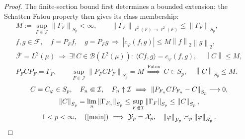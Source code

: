 \documentclass[11pt]{amsart}
\newcommand{\X}{\mathcal X}
\newcommand{\Y}{\mathcal Y}
\newcommand{\ip}[2]{\langle #1,#2\rangle}
\newcommand{\norm}[1]{\left\|#1\right\|}
\newcommand{\fin}{\Subset}
\begin{document}
\begin{proof}
The finite-section bound first determines a bounded extension;
the Schatten Fatou property then gives its class membership:
\begin{gather*}
 M:=\sup_{F\fin\mathcal I}\norm{\Gamma_F}_{S_p}<\infty,\qquad
 \norm{\Gamma_F}_{\ell^2(F)\to\ell^2(F)}\le\norm{\Gamma_F}_{S_p},\\
 f,g\in\mathscr F,\quad f=P_Ff,\quad g=P_Fg
 \ \Longrightarrow\
 |c_\varphi(f,g)|\le M\norm f_2\norm g_2,\\
 \overline{\mathscr F}=L^2(\mu)
 \ \Longrightarrow\
 \exists!\, C\in\mathcal B(L^2(\mu)):\
 \ip{Cf}{g}=c_\varphi(f,g),\quad \norm C\le M,\\
 P_FCP_F=\Gamma_F,\qquad
 \sup_{F\fin\mathcal I}\norm{P_FCP_F}_{S_p}=M
 \ \overset{\mathrm{Fatou}}{\Longrightarrow}\
 C\in S_p,\quad\norm C_{S_p}\le M.
\end{gather*}
\begin{gather*}
 C=C_\varphi\in S_p,\quad F_n\fin\mathcal I,\quad F_n\uparrow\mathcal I
 \ \Longrightarrow\
 \norm{P_{F_n}CP_{F_n}-C}_{S_p}\longrightarrow0,\\
 \norm C_{S_p}
  =\lim_n\norm{\Gamma_{F_n}}_{S_p}
  \le\sup_{F\fin\mathcal I}\norm{\Gamma_F}_{S_p}
  \le\norm C_{S_p},\\
 1<p<\infty,\quad(\ref{main})
 \ \Longrightarrow\
 \Y_p=\X_p,\quad\norm{\varphi}_{\Y_p}\asymp_p\norm{\varphi}_{\X_p}.
\end{gather*}
\end{proof}
\end{document}
